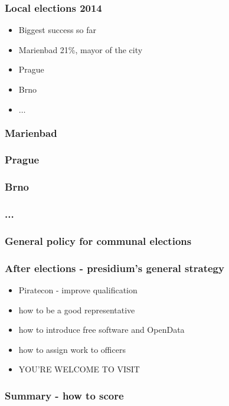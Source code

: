 \begin{frame}
	\frametitle{Local elections 2014}
	\begin{itemize}
		\item Biggest success so far
		\item Marienbad 21\%, mayor of the city
		\item Prague
		\item Brno
		\item $\dots$		
	\end{itemize}
\end{frame}
\begin{frame}
	\frametitle{Marienbad}
\end{frame}
\begin{frame}
	\frametitle{Prague}
\end{frame}
\begin{frame}
	\frametitle{Brno}
\end{frame}
\begin{frame}
	\frametitle{...}
\end{frame}
\begin{frame}
	\frametitle{General policy for communal elections}
\end{frame}
\begin{frame}
	\frametitle{After elections - presidium's general strategy}
	\begin{itemize}
		\item Piratecon - improve qualification
		\item how to be a good representative
		\item how to introduce free software and OpenData
		\item how to assign work to officers
		\item YOU'RE WELCOME TO VISIT
	\end{itemize}
\end{frame}
\begin{frame}
	\frametitle{Summary - how to score}
\end{frame}